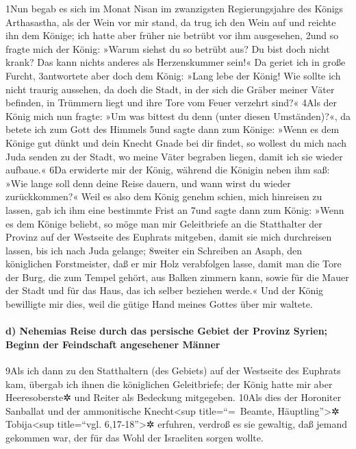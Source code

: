 1Nun begab es sich im Monat Nisan im zwanzigsten Regierungsjahre des
Königs Arthasastha, als der Wein vor mir stand, da trug ich den Wein auf
und reichte ihn dem Könige; ich hatte aber früher nie betrübt vor ihm
ausgesehen, 2und so fragte mich der König: »Warum siehst du so betrübt
aus? Du bist doch nicht krank? Das kann nichts anderes als Herzenskummer
sein!« Da geriet ich in große Furcht, 3antwortete aber doch dem König:
»Lang lebe der König! Wie sollte ich nicht traurig aussehen, da doch die
Stadt, in der sich die Gräber meiner Väter befinden, in Trümmern liegt
und ihre Tore vom Feuer verzehrt sind?« 4Als der König mich nun fragte:
»Um was bittest du denn (unter diesen Umständen)?«, da betete ich zum
Gott des Himmels 5und sagte dann zum Könige: »Wenn es dem Könige gut
dünkt und dein Knecht Gnade bei dir findet, so wollest du mich nach Juda
senden zu der Stadt, wo meine Väter begraben liegen, damit ich sie
wieder aufbaue.« 6Da erwiderte mir der König, während die Königin neben
ihm saß: »Wie lange soll denn deine Reise dauern, und wann wirst du
wieder zurückkommen?« Weil es also dem König genehm schien, mich
hinreisen zu lassen, gab ich ihm eine bestimmte Frist an 7und sagte dann
zum König: »Wenn es dem Könige beliebt, so möge man mir Geleitbriefe an
die Statthalter der Provinz auf der Westseite des Euphrats mitgeben,
damit sie mich durchreisen lassen, bis ich nach Juda gelange; 8weiter
ein Schreiben an Asaph, den königlichen Forstmeister, daß er mir Holz
verabfolgen lasse, damit man die Tore der Burg, die zum Tempel gehört,
aus Balken zimmern kann, sowie für die Mauer der Stadt und für das Haus,
das ich selber beziehen werde.« Und der König bewilligte mir dies, weil
die gütige Hand meines Gottes über mir waltete.

\hypertarget{d-nehemias-reise-durch-das-persische-gebiet-der-provinz-syrien-beginn-der-feindschaft-angesehener-muxe4nner}{%
\paragraph{d) Nehemias Reise durch das persische Gebiet der Provinz
Syrien; Beginn der Feindschaft angesehener
Männer}\label{d-nehemias-reise-durch-das-persische-gebiet-der-provinz-syrien-beginn-der-feindschaft-angesehener-muxe4nner}}

9Als ich dann zu den Statthaltern (des Gebiets) auf der Westseite des
Euphrats kam, übergab ich ihnen die königlichen Geleitbriefe; der König
hatte mir aber Heeresoberste✲ und Reiter als Bedeckung mitgegeben. 10Als
dies der Horoniter Sanballat und der ammonitische Knecht\textless sup
title=``=~Beamte, Häuptling''\textgreater✲ Tobija\textless sup
title=``vgl. 6,17-18''\textgreater✲ erfuhren, verdroß es sie gewaltig,
daß jemand gekommen war, der für das Wohl der Israeliten sorgen wollte.

